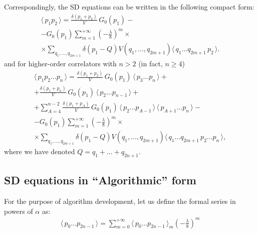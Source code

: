 \documentclass[12pt]{article}
\newcommand{\lr}[1]{ \left( #1 \right) }
\newcommand{\vev}[1]{ \langle \, #1 \, \rangle }
\begin{document}
Correspondingly, the SD equations can be written in the following compact form:
\begin{eqnarray}
\label{sd_eqs_G2_mom_vertex}
 \vev{p_1 p_2} = \frac{\delta\lr{p_1 + p_2}}{V} \, G_0\lr{p_1}
 - \nonumber \\ -
 G_0\lr{p_1} \sum\limits_{m=1}^{+\infty}
 \lr{-\frac{\lambda}{8}}^m
 \times \nonumber \\ \times
 \sum\limits_{q_1, \ldots, q_{2 m + 1}}
 \delta\lr{p_1 - Q}
 V\lr{q_1, \ldots, q_{2 m + 1}}
 \vev{q_1 \ldots q_{2 m + 1} \, p_2} .
\end{eqnarray}
and for higher-order correlators with $n > 2$ (in fact, $n \geq 4$)
\begin{eqnarray}
\label{sd_eqs_Gn_mom_vertex}
 \vev{p_1 p_2 \ldots p_n}
 =
 \frac{\delta\lr{p_1 + p_2}}{V} \, G_0\lr{p_1} \, \vev{p_3 \ldots p_n}
 + \nonumber \\ +
 \frac{\delta\lr{p_1 + p_n}}{V} \, G_0\lr{p_1} \, \vev{p_2 \ldots p_{n-1}}
 + \nonumber \\ +
 \sum\limits_{A=4}^{n-2}
 \frac{\delta\lr{p_1 + p_A}}{V} \, G_0\lr{p_1} \,
 \vev{p_2 \ldots p_{A-1}} \, \vev{p_{A+1} \ldots p_n}
 - \nonumber \\ -
 G_0\lr{p_1} \sum\limits_{m=1}^{+\infty}
 \lr{-\frac{\lambda}{8}}^m
 \times \nonumber \\ \times
 \sum\limits_{q_1, \ldots, q_{2 m + 1}}
 \delta\lr{p_1 - Q}
 V\lr{q_1, \ldots, q_{2 m + 1}}
 \vev{q_1 \ldots q_{2 m + 1} \, p_2  \ldots p_n} ,
\end{eqnarray}
where we have denoted $Q = q_1 + \ldots + q_{2 n + 1}$.

\subsection{SD equations in ``Algorithmic'' form}
\label{subsec:sds_algorithmic}

 For the purpose of algorithm development, let us define the formal series in powers of $\alpha$ as:
\begin{eqnarray}
\label{alpha_series_def}
 \vev{p_0 \ldots p_{2 n - 1}}
 =
 \sum\limits_{m=0}^{+\infty}
 \vev{p_0 \ldots p_{2 n - 1}}_m \lr{-\frac{\lambda}{8}}^m
\end{eqnarray}
\end{document}
